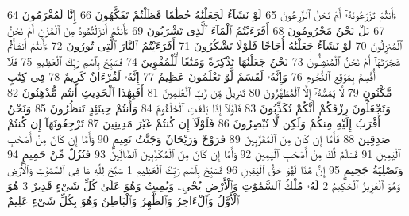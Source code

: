 {\tiny\colorbox{cl_aya}{64}} ءَأَنتُمْ تَزْرَعُونَهُۥٓ أَمْ نَحْنُ ٱلزَّٰرِعُونَ
{\tiny\colorbox{cl_aya}{65}} لَوْ نَشَآءُ لَجَعَلْنَٰهُ حُطَٰمًا فَظَلْتُمْ تَفَكَّهُونَ
{\tiny\colorbox{cl_aya}{66}} إِنَّا لَمُغْرَمُونَ
{\tiny\colorbox{cl_aya}{67}} بَلْ نَحْنُ مَحْرُومُونَ
{\tiny\colorbox{cl_aya}{68}} أَفَرَءَيْتُمُ ٱلْمَآءَ ٱلَّذِى تَشْرَبُونَ
{\tiny\colorbox{cl_aya}{69}} ءَأَنتُمْ أَنزَلْتُمُوهُ مِنَ ٱلْمُزْنِ أَمْ نَحْنُ ٱلْمُنزِلُونَ
{\tiny\colorbox{cl_aya}{70}} لَوْ نَشَآءُ جَعَلْنَٰهُ أُجَاجًا فَلَوْلَا تَشْكُرُونَ
{\tiny\colorbox{cl_aya}{71}} أَفَرَءَيْتُمُ ٱلنَّارَ ٱلَّتِى تُورُونَ
{\tiny\colorbox{cl_aya}{72}} ءَأَنتُمْ أَنشَأْتُمْ شَجَرَتَهَآ أَمْ نَحْنُ ٱلْمُنشِـُٔونَ
{\tiny\colorbox{cl_aya}{73}} نَحْنُ جَعَلْنَٰهَا تَذْكِرَةً وَمَتَٰعًا لِّلْمُقْوِينَ
{\tiny\colorbox{cl_aya}{74}} فَسَبِّحْ بِٱسْمِ رَبِّكَ ٱلْعَظِيمِ
{\tiny\colorbox{cl_aya}{75}} فَلَآ أُقْسِمُ بِمَوَٰقِعِ ٱلنُّجُومِ
{\tiny\colorbox{cl_aya}{76}} وَإِنَّهُۥ لَقَسَمٌ لَّوْ تَعْلَمُونَ عَظِيمٌ
{\tiny\colorbox{cl_aya}{77}} إِنَّهُۥ لَقُرْءَانٌ كَرِيمٌ
{\tiny\colorbox{cl_aya}{78}} فِى كِتَٰبٍ مَّكْنُونٍ
{\tiny\colorbox{cl_aya}{79}} لَّا يَمَسُّهُۥٓ إِلَّا ٱلْمُطَهَّرُونَ
{\tiny\colorbox{cl_aya}{80}} تَنزِيلٌ مِّن رَّبِّ ٱلْعَٰلَمِينَ
{\tiny\colorbox{cl_aya}{81}} أَفَبِهَٰذَا ٱلْحَدِيثِ أَنتُم مُّدْهِنُونَ
{\tiny\colorbox{cl_aya}{82}} وَتَجْعَلُونَ رِزْقَكُمْ أَنَّكُمْ تُكَذِّبُونَ
{\tiny\colorbox{cl_aya}{83}} فَلَوْلَآ إِذَا بَلَغَتِ ٱلْحُلْقُومَ
{\tiny\colorbox{cl_aya}{84}} وَأَنتُمْ حِينَئِذٍ تَنظُرُونَ
{\tiny\colorbox{cl_aya}{85}} وَنَحْنُ أَقْرَبُ إِلَيْهِ مِنكُمْ وَلَٰكِن لَّا تُبْصِرُونَ
{\tiny\colorbox{cl_aya}{86}} فَلَوْلَآ إِن كُنتُمْ غَيْرَ مَدِينِينَ
{\tiny\colorbox{cl_aya}{87}} تَرْجِعُونَهَآ إِن كُنتُمْ صَٰدِقِينَ
{\tiny\colorbox{cl_aya}{88}} فَأَمَّآ إِن كَانَ مِنَ ٱلْمُقَرَّبِينَ
{\tiny\colorbox{cl_aya}{89}} فَرَوْحٌ وَرَيْحَانٌ وَجَنَّتُ نَعِيمٍ
{\tiny\colorbox{cl_aya}{90}} وَأَمَّآ إِن كَانَ مِنْ أَصْحَٰبِ ٱلْيَمِينِ
{\tiny\colorbox{cl_aya}{91}} فَسَلَٰمٌ لَّكَ مِنْ أَصْحَٰبِ ٱلْيَمِينِ
{\tiny\colorbox{cl_aya}{92}} وَأَمَّآ إِن كَانَ مِنَ ٱلْمُكَذِّبِينَ ٱلضَّآلِّينَ
{\tiny\colorbox{cl_aya}{93}} فَنُزُلٌ مِّنْ حَمِيمٍ
{\tiny\colorbox{cl_aya}{94}} وَتَصْلِيَةُ جَحِيمٍ
{\tiny\colorbox{cl_aya}{95}} إِنَّ هَٰذَا لَهُوَ حَقُّ ٱلْيَقِينِ
{\tiny\colorbox{cl_aya}{96}} فَسَبِّحْ بِٱسْمِ رَبِّكَ ٱلْعَظِيمِ
{\tiny\colorbox{cl_aya}{1}} سَبَّحَ لِلَّهِ مَا فِى ٱلسَّمَٰوَٰتِ وَٱلْأَرْضِ وَهُوَ ٱلْعَزِيزُ ٱلْحَكِيمُ
{\tiny\colorbox{cl_aya}{2}} لَهُۥ مُلْكُ ٱلسَّمَٰوَٰتِ وَٱلْأَرْضِ يُحْىِۦ وَيُمِيتُ وَهُوَ عَلَىٰ كُلِّ شَىْءٍ قَدِيرٌ
{\tiny\colorbox{cl_aya}{3}} هُوَ ٱلْأَوَّلُ وَٱلْءَاخِرُ وَٱلظَّٰهِرُ وَٱلْبَاطِنُ وَهُوَ بِكُلِّ شَىْءٍ عَلِيمٌ
